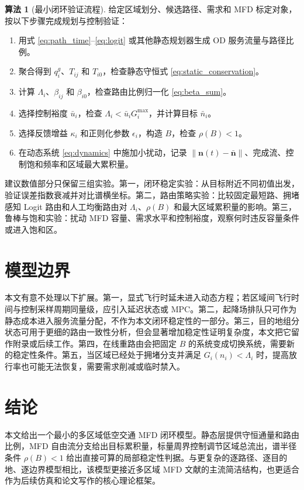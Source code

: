 \documentclass[a4paper,12pt]{article}
\theoremstyle{plain}
\theoremstyle{definition}
\newtheorem{algorithm}[theorem]{算法}
\theoremstyle{remark}
\begin{document}
\begin{algorithm}[最小闭环验证流程]\label{alg:verify}
给定区域划分、候选路径、需求和 MFD 标定对象，按以下步骤完成规划与控制验证：
\begin{enumerate}
    \item 用式 \eqref{eq:path_time}--\eqref{eq:logit} 或其他静态规划器生成 OD 服务流量与路径比例。
    \item 聚合得到 $q_i^g$、$T_{ij}$ 和 $T_{i0}$，检查静态守恒式 \eqref{eq:static_conservation}。
    \item 计算 $\Lambda_i$、$\beta_{ij}$ 和 $\beta_{i0}$，检查路由比例归一化 \eqref{eq:beta_sum}。
    \item 选择控制裕度 $\bar u_i$，检查 $\Lambda_i<\bar u_iG_i^{\max}$，并计算目标 $\bar n_i$。
    \item 选择反馈增益 $\kappa_i$ 和正则化参数 $\epsilon_i$，构造 $B$，检查 $\rho(B)<1$。
    \item 在动态系统 \eqref{eq:dynamics} 中施加小扰动，记录 $\|\bm n(t)-\bar{\bm n}\|$、完成流、控制饱和频率和区域最大累积量。
\end{enumerate}
\end{algorithm}

建议数值部分只保留三组实验。第一，闭环稳定实验：从目标附近不同初值出发，验证误差指数衰减并对比谱横坐标。第二，路由策略实验：比较固定最短路、拥堵感知 Logit 路由和人工均衡路由对 $\Lambda_i$、$\rho(B)$ 和最大区域累积量的影响。第三，鲁棒与饱和实验：扰动 MFD 容量、需求水平和控制裕度，观察何时违反容量条件或进入饱和区。

\section{模型边界}

本文有意不处理以下扩展。第一，显式飞行时延未进入动态方程；若区域间飞行时间与控制采样周期同量级，应引入延迟状态或 MPC。第二，起降场排队只可作为静态成本进入服务流量分配，不作为本文闭环稳定性的一部分。第三，目的地组分状态可用于更细的路由一致性分析，但会显著增加稳定性证明复杂度，本文把它留作附录或后续工作。第四，在线重路由会把固定 $B$ 的系统变成切换系统，需要新的稳定性条件。第五，当区域已经处于拥堵分支并满足 $G_i(n_i)<\Lambda_i$ 时，提高放行率也可能无法恢复，需要需求削减或临时禁入。

\section{结论}

本文给出一个最小的多区域低空交通 MFD 闭环模型。静态层提供守恒通量和路由比例，MFD 自由流分支给出目标累积量，标量周界控制调节区域总流出，谱半径条件 $\rho(B)<1$ 给出直接可算的局部稳定性判据。与更复杂的逐路径、逐目的地、逐边界模型相比，该模型更接近多区域 MFD 文献的主流简洁结构，也更适合作为后续仿真和论文写作的核心理论框架。
\end{document}
